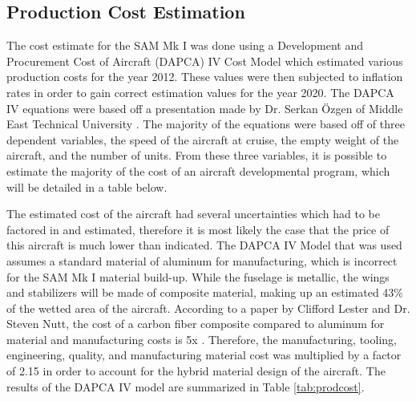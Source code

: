 \subsection{Production Cost Estimation}

The cost estimate for the SAM Mk I was done using a Development and Procurement Cost of Aircraft (DAPCA) IV Cost Model which estimated various production costs for the year 2012. These values were then subjected to inflation rates in order to gain correct estimation values for the year 2020. The DAPCA IV equations were based off a presentation made by Dr. Serkan Özgen of Middle East Technical University \cite{dapca}. The majority of the equations were based off of three dependent variables, the speed of the aircraft at cruise, the empty weight of the aircraft, and the number of units. From these three variables, it is possible to estimate the majority of the cost of an aircraft developmental program, which will be detailed in a table below.

The estimated cost of the aircraft had several uncertainties which had to be factored in and estimated, therefore it is most likely the case that the price of this aircraft is much lower than indicated. The DAPCA IV Model that was used assumes a standard material of aluminum for manufacturing, which is incorrect for the SAM Mk I material build-up. While the fuselage is metallic, the wings and stabilizers will be made of composite material, making up an estimated 43\% of the wetted area of the aircraft. According to a paper by Clifford Lester and Dr. Steven Nutt, the cost of a carbon fiber composite compared to aluminum for material and manufacturing costs is 5x \cite{compositecost}. Therefore, the manufacturing, tooling, engineering, quality, and manufacturing material cost was multiplied by a factor of 2.15 in order to account for the hybrid material design of the aircraft. The results of the DAPCA IV model are summarized in Table \ref{tab:prodcost}.


